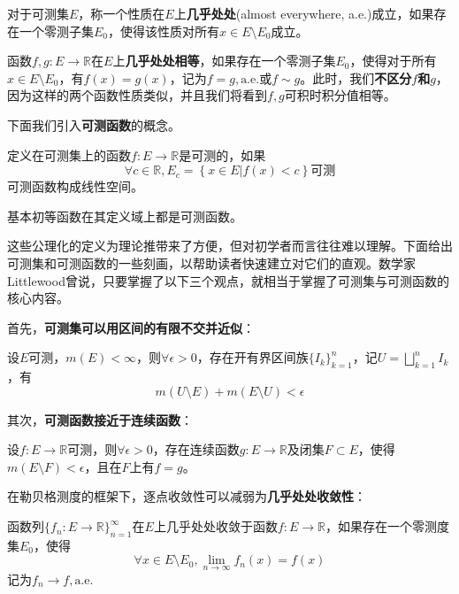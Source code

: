 \begin{definition}[几乎处处]
    对于可测集$E$，称一个性质在$E$上\textbf{几乎处处}(almost everywhere, a.e.)成立，如果存在一个零测子集$E_0$，使得该性质对所有$x\in E\setminus E_0$成立。
\end{definition}

\begin{example}[几乎处处相等]
    函数$f,g:E\to\mathbb{R}$在$E$上\textbf{几乎处处相等}，如果存在一个零测子集$E_0$，使得对于所有$x\in E\setminus E_0$，有$f(x)=g(x)$，记为$f=g,\text{a.e.}$或$f\sim g$。此时，我们\textbf{不区分$f$和$g$}，因为这样的两个函数性质类似，并且我们将看到$f,g$可积时积分值相等。
\end{example}

下面我们引入\textbf{可测函数}的概念。

\begin{definition}[可测函数]
    定义在可测集上的函数$f:E\to\mathbb{R}$是可测的，如果
    $$\forall c\in\mathbb{R},E_c=\left\{x\in E\left| f(x)<c\right.\right\}\text{可测}$$
    可测函数构成线性空间。
\end{definition}
\begin{example}
    基本初等函数在其定义域上都是可测函数。
\end{example}

这些公理化的定义为理论推带来了方便，但对初学者而言往往难以理解。下面给出可测集和可测函数的一些刻画，以帮助读者快速建立对它们的直观。数学家Littlewood曾说\cite{real_analysis}，只要掌握了以下三个观点，就相当于掌握了可测集与可测函数的核心内容。

首先，\textbf{可测集可以用区间的有限不交并近似}：

\begin{theorem}
    设$E$可测，$m(E)<\infty$，则$\forall \epsilon>0$，存在开有界区间族$\{I_k\}_{k=1}^{n}$，记$U=\bigsqcup_{k=1}^{n} I_k$，有
    \[m(U\setminus E)+m(E\setminus U)<\epsilon\]
\end{theorem}

其次，\textbf{可测函数接近于连续函数}：

\begin{theorem}[Lusin定理]
    设$f:E\to\mathbb{R}$可测，则$\forall \epsilon>0$，存在连续函数$g:E\to\mathbb{R}$及闭集$F\subset E$，使得$m(E\setminus F)<\epsilon$，且在$F$上有$f=g$。
\end{theorem}

在勒贝格测度的框架下，逐点收敛性可以减弱为\textbf{几乎处处收敛性}：

\begin{definition}[几乎处处收敛]
    函数列$\{f_n:E\to\mathbb{R}\}_{n=1}^{\infty}$在$E$上几乎处处收敛于函数$f:E\to\mathbb{R}$，如果存在一个零测度集$E_0$，使得
    $$\forall x\in E\setminus E_0,\lim_{n\to\infty}f_n(x)=f(x)$$
    记为$f_n\to f,\text{a.e.}$
\end{definition}


